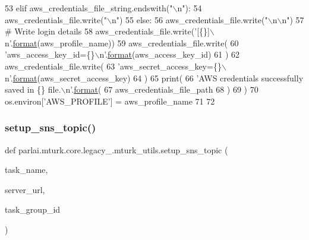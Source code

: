 \begin{DoxyCode}
53                 \textcolor{keywordflow}{elif} aws\_credentials\_file\_string.endswith(\textcolor{stringliteral}{"\(\backslash\)n"}):
54                     aws\_credentials\_file.write(\textcolor{stringliteral}{"\(\backslash\)n"})
55                 \textcolor{keywordflow}{else}:
56                     aws\_credentials\_file.write(\textcolor{stringliteral}{"\(\backslash\)n\(\backslash\)n"})
57             \textcolor{comment}{# Write login details}
58             aws\_credentials\_file.write(\textcolor{stringliteral}{'[\{\}]\(\backslash\)n'}.\hyperlink{namespaceparlai_1_1chat__service_1_1services_1_1messenger_1_1shared__utils_a32e2e2022b824fbaf80c747160b52a76}{format}(aws\_profile\_name))
59             aws\_credentials\_file.write(
60                 \textcolor{stringliteral}{'aws\_access\_key\_id=\{\}\(\backslash\)n'}.\hyperlink{namespaceparlai_1_1chat__service_1_1services_1_1messenger_1_1shared__utils_a32e2e2022b824fbaf80c747160b52a76}{format}(aws\_access\_key\_id)
61             )
62             aws\_credentials\_file.write(
63                 \textcolor{stringliteral}{'aws\_secret\_access\_key=\{\}\(\backslash\)n'}.\hyperlink{namespaceparlai_1_1chat__service_1_1services_1_1messenger_1_1shared__utils_a32e2e2022b824fbaf80c747160b52a76}{format}(aws\_secret\_access\_key)
64             )
65         print(
66             \textcolor{stringliteral}{'AWS credentials successfully saved in \{\} file.\(\backslash\)n'}.\hyperlink{namespaceparlai_1_1chat__service_1_1services_1_1messenger_1_1shared__utils_a32e2e2022b824fbaf80c747160b52a76}{format}(
67                 aws\_credentials\_file\_path
68             )
69         )
70     os.environ[\textcolor{stringliteral}{'AWS\_PROFILE'}] = aws\_profile\_name
71 
72 
\end{DoxyCode}
\mbox{\label{namespaceparlai_1_1mturk_1_1core_1_1legacy__2018_1_1mturk__utils_ab542ba532f3609913b9b2ac465bf6e53}} 
\subsubsection{\texorpdfstring{setup\+\_\+sns\+\_\+topic()}{setup\_sns\_topic()}}
{\footnotesize\ttfamily def parlai.\+mturk.\+core.\+legacy\+\_.\+mturk\+\_\+utils.\+setup\+\_\+sns\+\_\+topic (\begin{DoxyParamCaption}\item[{}]{task\+\_\+name,  }\item[{}]{server\+\_\+url,  }\item[{}]{task\+\_\+group\+\_\+id }\end{DoxyParamCaption})}



